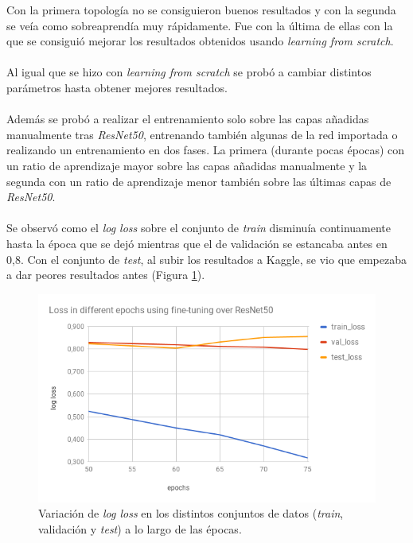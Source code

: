 Con la primera topología no se consiguieron buenos resultados y con la segunda se veía como sobreaprendía muy rápidamente. Fue con la última de ellas con la que se consiguió mejorar los resultados obtenidos usando \textit{learning from scratch}.
\\ \\
Al igual que se hizo con \textit{learning from scratch} se probó a cambiar distintos parámetros hasta obtener mejores resultados.
\\ \\
Además se probó a realizar el entrenamiento solo sobre las capas añadidas manualmente tras \textit{ResNet50}, entrenando también algunas de la red importada o realizando un entrenamiento en dos fases. La primera (durante pocas épocas) con un ratio de aprendizaje mayor sobre las capas añadidas manualmente y la segunda con un ratio de aprendizaje menor también sobre las últimas capas de \textit{ResNet50}.
\\ \\
Se observó como el \textit{log loss} sobre el conjunto de \textit{train} disminuía continuamente hasta la época que se dejó mientras que el de validación se estancaba antes en 0,8. Con el conjunto de \textit{test}, al subir los resultados a Kaggle, se vio que empezaba a dar peores resultados antes (Figura \ref{fig:loss-variation-fine-tuning}).

\begin{figure}[H]
	\centering
	\includegraphics[width=12cm]{img/loss-variation-fine-tuning}
	\caption{Variación de \textit{log loss} en los distintos conjuntos de datos (\textit{train}, validación y \textit{test}) a lo largo de las épocas.}
	\label{fig:loss-variation-fine-tuning}
\end{figure}

